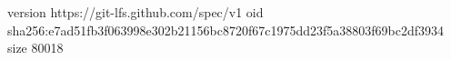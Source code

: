 version https://git-lfs.github.com/spec/v1
oid sha256:e7ad51fb3f063998e302b21156bc8720f67c1975dd23f5a38803f69bc2df3934
size 80018
